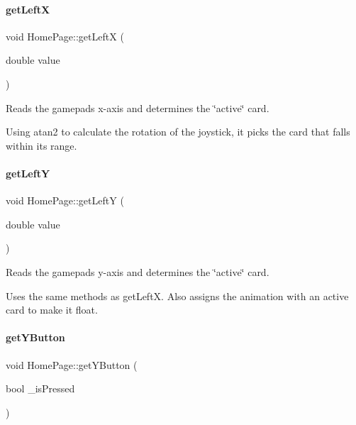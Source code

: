 \paragraph{\texorpdfstring{getLeftX}{getLeftX}}
{\footnotesize\ttfamily void Home\+Page\+::get\+LeftX (\begin{DoxyParamCaption}\item[{double}]{value }\end{DoxyParamCaption})\hspace{0.3cm}{\ttfamily [slot]}}

Reads the gamepad\textquotesingle{}s x-\/axis and determines the \char`\"{}active\char`\"{} card.

Using atan2 to calculate the rotation of the joystick, it picks the card that falls within its range. \mbox{\label{classHomePage_a38c909855e6b1e1a0739642949aa4f9a}} 
\paragraph{\texorpdfstring{getLeftY}{getLeftY}}
{\footnotesize\ttfamily void Home\+Page\+::get\+LeftY (\begin{DoxyParamCaption}\item[{double}]{value }\end{DoxyParamCaption})\hspace{0.3cm}{\ttfamily [slot]}}

Reads the gamepad\textquotesingle{}s y-\/axis and determines the \char`\"{}active\char`\"{} card.

Uses the same methods as get\+LeftX. Also assigns the animation with an active card to make it float. \mbox{\label{classHomePage_a8b38e0816ef5b863f13de62848a79d1e}} 
\paragraph{\texorpdfstring{getYButton}{getYButton}}
{\footnotesize\ttfamily void Home\+Page\+::get\+Y\+Button (\begin{DoxyParamCaption}\item[{bool}]{\+\_\+is\+Pressed }\end{DoxyParamCaption})\hspace{0.3cm}{\ttfamily [slot]}}

